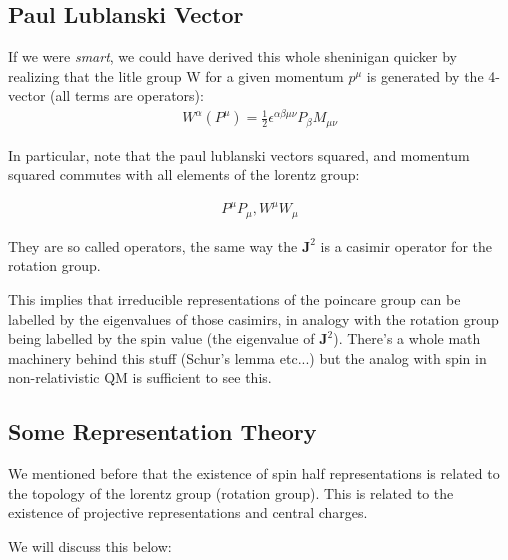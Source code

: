 \documentclass[12pt]{scrartcl}
\begin{document}
\subsection{Paul Lublanski Vector}

If we were \emph{smart}, we could have derived this whole sheninigan quicker by realizing that the litle group W for a given momentum $p^\mu$  is generated by the  4-vector (all terms are operators):
\begin{align}
W^{\alpha}(P^\mu) = \frac12 \epsilon^{\alpha \beta \mu \nu} P_\beta M_{\mu \nu}
\end{align}

In particular, note that the paul lublanski vectors squared, and momentum squared commutes with all elements of the lorentz group:

\begin{align}
P^{\mu}P_\mu, W^\mu W_\mu
\end{align}

They are so called  operators, the same way the $\mathbf{J}^2$ is a casimir operator for the rotation group.

This implies that irreducible representations of the poincare group can be labelled by the eigenvalues of those casimirs, in analogy with the rotation group being labelled by the spin value (the eigenvalue of $\mathbf{J}^2$).  There's a whole math machinery behind this stuff (Schur's lemma etc...) but the analog with spin in non-relativistic QM is sufficient to see this.


\subsection{Some Representation Theory}

We mentioned before that the existence of spin half representations is related to the topology of the lorentz group (rotation group).  This is related to the existence of projective representations and central charges.

We will discuss this below:
\end{document}
